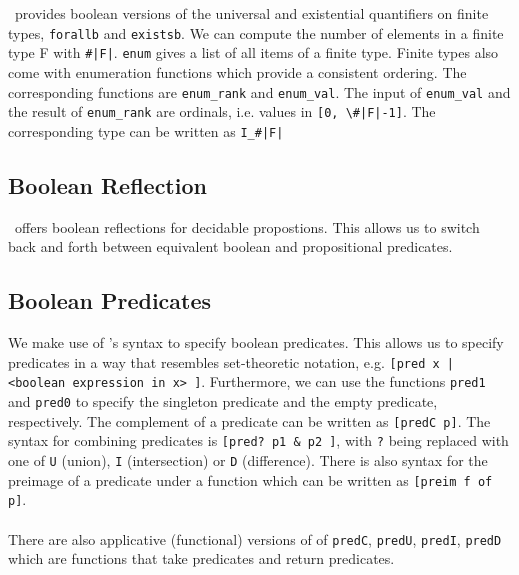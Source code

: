 \ssreflect\ provides boolean versions of the universal and existential quantifiers on finite types, \lstinline{forallb} and \lstinline{existsb}.
We can compute the number of elements in a finite type F with \lstinline{#|F|}.
\lstinline{enum} gives a list of all items of a finite type. 
Finite types also come with enumeration functions which provide a consistent ordering. 
The corresponding functions are \lstinline{enum_rank} and \lstinline{enum_val}. 
The input of \lstinline{enum_val} and the result of \lstinline{enum_rank} are ordinals, i.e. values in \lstinline{[0, \#|F|-1]}. 
The corresponding type can be written as \lstinline{I_#|F|}

\subsection{Boolean Reflection}
\ssreflect\ offers boolean reflections for decidable propostions. 
This allows us to switch back and forth between equivalent boolean and propositional predicates.

\subsection{Boolean Predicates}
We make use of \ssreflect's syntax to specify boolean predicates.
This allows us to specify predicates in a way that resembles set-theoretic notation, e.g. 
\lstinline{[pred x | <boolean expression in x> ]}.
Furthermore, we can use the functions \lstinline{pred1} and \lstinline{pred0} to specify the singleton predicate and the empty predicate, respectively.
The complement of a predicate can be written as \lstinline{[predC p]}. 
The syntax for combining predicates is \lstinline{[pred? p1 & p2 ]}, with \lstinline{?} being replaced with one of 
\lstinline{U} (union), \lstinline{I} (intersection) or \lstinline{D} (difference).
There is also syntax for the preimage of a predicate under a function
which can be written as \lstinline{[preim f of p]}.


\paragraph{}
There are also applicative (functional) versions of of \lstinline{predC}, \lstinline{predU}, \lstinline{predI}, \lstinline{predD} which are functions that take predicates and return predicates.

